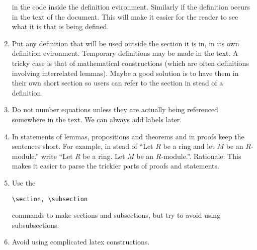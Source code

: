 \begin{enumerate}
\begin{verbatim}
\end{verbatim}
in the code inside the definition evironment.
Similarly if the definition occurs in the text of the document.
This will make it easier for the reader to see what it is
that is being defined.
\item Put any definition that will be used outside the section
it is in, in its own definition evironment. Temporary definitions
may be made in the text. A tricky case is that of mathematical
constructions (which are often definitions involving interrelated
lemmas). Maybe a good solution is to have them in their own
short section so users can refer to the section in stead of
a definition.
\item Do not number equations unless they are actually being
referenced somewhere in the text. We can always add labels later.
\item In statements of lemmas, propositions and theorems and
in proofs keep the sentences short. For example, in stead of
``Let $R$ be a ring and let $M$ be an $R$-module.'' write
``Let $R$ be a ring. Let $M$ be an $R$-module.''. Rationale:
This makes it easier to parse the trickier parts of proofs and
statements.
\item Use the
\begin{verbatim}
\section, \subsection
\end{verbatim}
commands to make sections and subsections,
but try to avoid using subsubsections.
\item Avoid using complicated latex constructions.
\end{enumerate}











